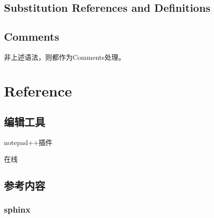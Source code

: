 \documentclass[a4paper,10pt,english]{sphinxmanual}
\begin{document}
\begin{sphinxVerbatim}[commandchars=\\\{\}]
  
     
  

  
\end{sphinxVerbatim}


\section{Substitution References and Definitions}
\label{\detokenize{reStructureText_syntax:substitution-references-and-definitions}}

\section{Comments}
\label{\detokenize{reStructureText_syntax:comments}}
\sphinxAtStartPar
非上述语法，则都作为Comments处理。

\sphinxstepscope


\chapter{Reference}
\label{\detokenize{reference:reference}}\label{\detokenize{reference::doc}}

\section{编辑工具}
\label{\detokenize{reference:id1}}
\sphinxAtStartPar
{} notepad++插件

\sphinxAtStartPar
{}  在线


\section{参考内容}
\label{\detokenize{reference:id2}}

\subsection{sphinx}
\label{\detokenize{reference:sphinx}}
\sphinxAtStartPar
{}
\end{document}
